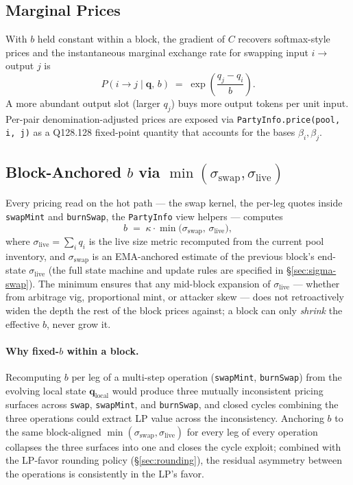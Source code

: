 \documentclass[11pt]{article}
\begin{document}
\subsection{Marginal Prices}

With $b$ held constant within a block, the gradient of $C$ recovers
softmax-style prices and the instantaneous marginal exchange rate for
swapping input $i \to$ output $j$ is
\begin{equation}
  P(i \to j \mid \mathbf{q},\,b) \;=\; \exp\!\left(\frac{q_j - q_i}{b}\right).
\end{equation}
A more abundant output slot (larger $q_j$) buys more output tokens per
unit input. Per-pair denomination-adjusted prices are exposed via
\texttt{PartyInfo.price(pool,\,i,\,j)} as a Q128.128 fixed-point quantity
that accounts for the bases $\beta_i, \beta_j$.

\subsection{Block-Anchored $b$ via $\min(\sigma_{\mathrm{swap}}, \sigma_{\mathrm{live}})$}
\label{sec:block-b}

Every pricing read on the hot path --- the swap kernel, the per-leg
quotes inside \texttt{swapMint} and \texttt{burnSwap}, the
\texttt{PartyInfo} view helpers --- computes
\begin{equation}
  b \;=\; \kappa \cdot \min\!\big(\sigma_{\mathrm{swap}},\,\sigma_{\mathrm{live}}\big),
\end{equation}
where $\sigma_{\mathrm{live}} = \sum_i q_i$ is the live size metric
recomputed from the current pool inventory, and $\sigma_{\mathrm{swap}}$
is an EMA-anchored estimate of the previous block's end-state
$\sigma_{\mathrm{live}}$ (the full state machine and update rules are
specified in \S\ref{sec:sigma-swap}). The minimum ensures that any
mid-block expansion of $\sigma_{\mathrm{live}}$ --- whether from
arbitrage vig, proportional mint, or attacker skew --- does not
retroactively widen the depth the rest of the block prices against; a
block can only \emph{shrink} the effective $b$, never grow it.

\paragraph{Why fixed-$b$ within a block.}
Recomputing $b$ per leg of a multi-step operation (\texttt{swapMint},
\texttt{burnSwap}) from the evolving local state
$\mathbf{q}_{\mathrm{local}}$ would produce three mutually inconsistent
pricing surfaces across \texttt{swap}, \texttt{swapMint}, and
\texttt{burnSwap}, and closed cycles combining the three operations
could extract LP value across the inconsistency. Anchoring $b$ to the
same block-aligned $\min(\sigma_{\mathrm{swap}}, \sigma_{\mathrm{live}})$
for every leg of every operation collapses the three surfaces into one
and closes the cycle exploit; combined with the LP-favor rounding policy
(\S\ref{sec:rounding}), the residual asymmetry between the operations is
consistently in the LP's favor.
\end{document}
